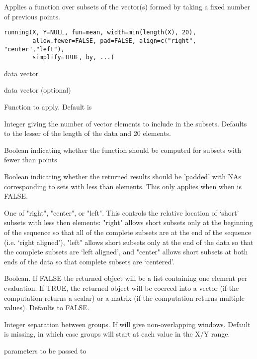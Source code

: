 \begin{Description}\relax
Applies a function over subsets of the vector(s) formed by
taking a fixed number of previous points.
\end{Description}
\begin{Usage}
\begin{verbatim}
running(X, Y=NULL, fun=mean, width=min(length(X), 20),
        allow.fewer=FALSE, pad=FALSE, align=c("right", "center","left"),
        simplify=TRUE, by, ...)
\end{verbatim}
\end{Usage}
\begin{Arguments}
\begin{ldescription}
\item[\code{X}] data vector 
\item[\code{Y}] data vector (optional) 
\item[\code{fun}] Function to apply. Default is 
\item[\code{width}] Integer giving the number of vector elements to include
in the subsets.  Defaults to the lesser of the length of the data and
20 elements.
\item[\code{allow.fewer}] Boolean indicating whether the function should be
computed for subsets with fewer than  points
\item[\code{pad}] Boolean indicating whether the returned results should
be 'padded' with NAs corresponding to sets with less than
 elements.  This only applies when when
 is FALSE.
\item[\code{align}] One of "right", "center", or "left".
This controls the relative location of `short' subsets with less
then  elements: "right" allows short subsets only at the
beginning of the sequence so that all of the complete subsets are at
the end of the sequence (i.e. `right aligned'), "left" allows short
subsets only at the end of the data so that the complete subsets
are `left aligned', and "center" allows short subsets at both ends
of the data so that complete subsets are `centered'.

\item[\code{simplify}] Boolean.  If FALSE the returned object will be a list
containing one element per evaluation.  If TRUE, the returned
object will be coerced into a vector (if the computation returns a
scalar) or a matrix (if the computation returns multiple values).
Defaults to FALSE.
\item[\code{by}] Integer separation between groups. If  will
give non-overlapping windows. Default is missing, in which case
groups will start at each value in the X/Y range.
\item[\code{...}] parameters to be passed to  
\end{ldescription}
\end{Arguments}
